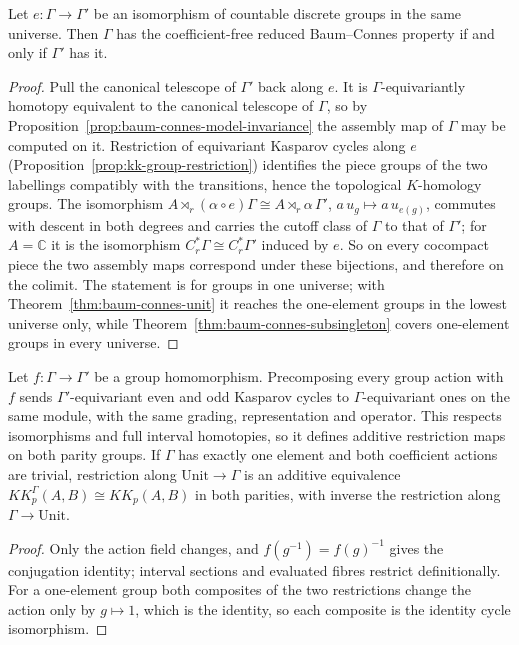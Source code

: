 \begin{theorem}\label{thm:baum-connes-group-iso}
\leanok
Let $e\colon\Gamma\to\Gamma'$ be an isomorphism of countable discrete groups in
the same universe. Then $\Gamma$ has the coefficient-free reduced Baum--Connes
property if and only if $\Gamma'$ has it.
\end{theorem}
\begin{proof}
\leanok
Pull the canonical telescope of $\Gamma'$ back along $e$. It is
$\Gamma$-equivariantly homotopy equivalent to the canonical telescope of
$\Gamma$, so by Proposition~\ref{prop:baum-connes-model-invariance} the assembly
map of $\Gamma$ may be computed on it. Restriction of equivariant Kasparov
cycles along $e$ (Proposition~\ref{prop:kk-group-restriction}) identifies the
piece groups of the two labellings compatibly with the transitions, hence the
topological $K$-homology groups. The isomorphism
$A\rtimes_r(\alpha\circ e)\Gamma\cong A\rtimes_r\alpha\,\Gamma'$,
$a\,u_g\mapsto a\,u_{e(g)}$, commutes with descent in both degrees and carries
the cutoff class of $\Gamma$ to that of $\Gamma'$; for $A=\mathbb C$ it is the
isomorphism $C^*_r\Gamma\cong C^*_r\Gamma'$ induced by $e$. So on every
cocompact piece the two assembly maps correspond under these bijections, and
therefore on the colimit. The statement is for groups in one universe; with
Theorem~\ref{thm:baum-connes-unit} it reaches the one-element groups in the
lowest universe only, while Theorem~\ref{thm:baum-connes-subsingleton} covers
one-element groups in every universe.
\end{proof}

\begin{proposition}\label{prop:kk-group-restriction}
\leanok
Let $f\colon \Gamma\to\Gamma'$ be a group homomorphism. Precomposing every
group action with $f$ sends $\Gamma'$-equivariant even and odd Kasparov cycles to
$\Gamma$-equivariant ones on the same module, with the same grading,
representation and operator. This respects isomorphisms and full interval
homotopies, so it defines additive restriction maps on both parity groups.
If $\Gamma$ has exactly one element and both coefficient actions are trivial,
restriction along $\mathrm{Unit}\to\Gamma$ is an additive equivalence
$KK^{\Gamma}_p(A,B)\cong KK_p(A,B)$ in both parities, with inverse the
restriction along $\Gamma\to\mathrm{Unit}$.
\end{proposition}
\begin{proof}
\leanok
Only the action field changes, and $f(g^{-1})=f(g)^{-1}$ gives the conjugation
identity; interval sections and evaluated fibres restrict definitionally. For a
one-element group both composites of the two restrictions change the action
only by $g\mapsto 1$, which is the identity, so each composite is the identity
cycle isomorphism.
\end{proof}

